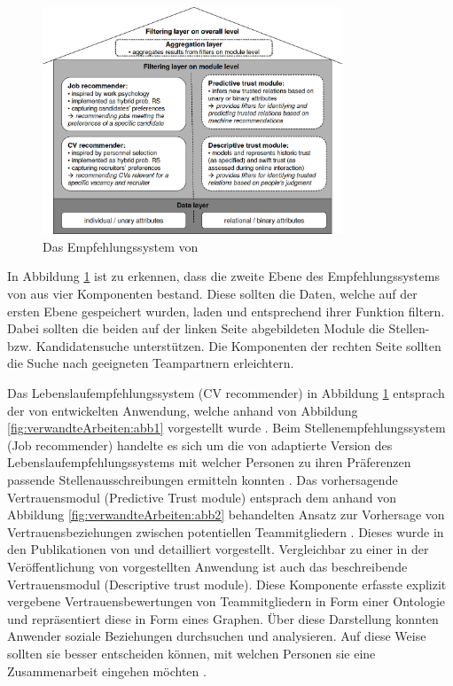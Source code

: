 \begin{figure}[h]
	\centering
	\includegraphics[width=0.8\textwidth]{gfx/keim-multilayer.png}
	\caption{Das Empfehlungssystem von \textcite[S. 5]{keim:2007}}
	\label{fig:verwandteArbeiten:abb3}
\end{figure}

In Abbildung \ref{fig:verwandteArbeiten:abb3} ist zu erkennen, dass die zweite Ebene des Empfehlungssystems von \textcite[S. 5ff.]{keim:2007} aus vier Komponenten bestand. Diese sollten die Daten, welche auf der ersten Ebene gespeichert wurden, laden und entsprechend ihrer Funktion filtern. Dabei sollten die beiden auf der linken Seite abgebildeten Module die Stellen- bzw. Kandidatensuche unterstützen. Die Komponenten der rechten Seite sollten die Suche nach geeigneten Teampartnern erleichtern.

Das Lebenslaufempfehlungssystem (CV recommender) in Abbildung \ref{fig:verwandteArbeiten:abb3} entsprach der von \textcite[S. 8ff.]{faerber:2003} entwickelten Anwendung, welche anhand von Abbildung \ref{fig:verwandteArbeiten:abb1} vorgestellt wurde \cite[S. 6]{keim:2007}. Beim Stellenempfehlungssystem (Job recommender) handelte es sich um die von \textcite[S. 4ff.]{malinowski:2006} adaptierte Version des Lebenslaufempfehlungssystems mit welcher Personen zu ihren Präferenzen passende Stellenausschreibungen ermitteln konnten \cite[S. 6]{keim:2007}. Das vorhersagende Vertrauensmodul (Predictive Trust module) entsprach dem anhand von Abbildung \ref{fig:verwandteArbeiten:abb2} behandelten Ansatz zur Vorhersage von Vertrauensbeziehungen zwischen potentiellen Teammitgliedern \cite[S. 8]{keim:2007}. Dieses wurde in den Publikationen von \textcite[S. 5ff.]{keim:2005} und \textcite[S. 4ff.]{malinowski:2005} detailliert vorgestellt. Vergleichbar zu einer in der Veröffentlichung von \textcite[S. 4f.]{keim:2005} vorgestellten Anwendung ist auch das beschreibende Vertrauensmodul (Descriptive trust module). Diese Komponente erfasste explizit vergebene Vertrauensbewertungen von Teammitgliedern in Form einer Ontologie und repräsentiert diese in Form eines Graphen. Über diese Darstellung konnten Anwender soziale Beziehungen durchsuchen und analysieren. Auf diese Weise sollten sie besser entscheiden können, mit welchen Personen sie eine Zusammenarbeit eingehen möchten \cite[S. 7]{keim:2007}.

